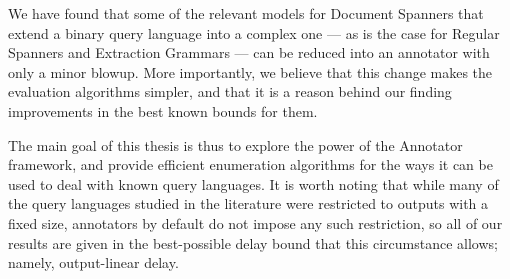 We have found that some of the relevant models for Document Spanners that extend a binary query language into a complex one --- as is the case for Regular Spanners and Extraction Grammars --- can be reduced into an annotator with only a minor blowup. More importantly, we believe that this change makes the evaluation algorithms simpler, and that it is a reason behind our finding improvements in the best known bounds for them.

The main goal of this thesis is thus to explore the power of the Annotator framework, and provide efficient enumeration algorithms for the ways it can be used to deal with known query languages. It is worth noting that while many of the query languages studied in the literature were restricted to outputs with a fixed size, annotators by default do not impose any such restriction, so all of our results are given in the best-possible delay bound that this circumstance allows; namely, output-linear delay.

%
%
%
%

